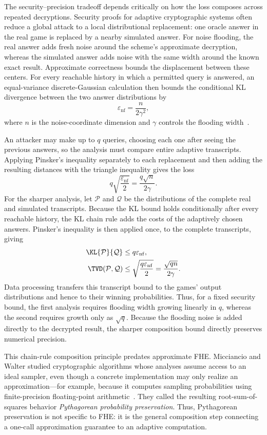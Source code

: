 The security--precision tradeoff depends critically on how the loss composes
across repeated decryptions.  Security proofs for adaptive cryptographic
systems often reduce a global attack to a local distributional replacement:
one oracle answer in the real game is replaced by a nearby simulated answer.
For noise flooding, the real answer adds fresh noise around the scheme's
approximate decryption, whereas the simulated answer adds noise with the same
width around the known exact result.  Approximate correctness bounds the
displacement between these centers.  For every reachable history in which a
permitted query is answered, an equal-variance discrete-Gaussian calculation
then bounds the conditional KL divergence between the two answer distributions
by
\[
  \varepsilon_{\mathrm{nf}} = \frac{n}{2\gamma^2},
\]
where \(n\) is the noise-coordinate dimension and \(\gamma\) controls the
flooding width~\cite{lmss}.

An attacker may make up to \(q\) queries, choosing each one after seeing the
previous answers, so the analysis must compare entire adaptive transcripts.
Applying Pinsker's inequality separately to each replacement and then adding
the resulting distances with the triangle inequality gives the loss
\[
  q\sqrt{\frac{\varepsilon_{\mathrm{nf}}}{2}}
  = \frac{q\sqrt{n}}{2\gamma}.
\]
For the sharper analysis, let \(\mathcal P\) and \(\mathcal Q\) be the
distributions of the complete real and simulated transcripts.  Because the KL
bound holds conditionally after every reachable history, the KL chain rule
adds the costs of the adaptively chosen answers.  Pinsker's inequality is then
applied once, to the complete transcripts, giving~\cite{lmss,mw17}
\begin{align*}
  \KL{\mathcal P}{\mathcal Q}
    &\leq q\varepsilon_{\mathrm{nf}},\\
  \TVD(\mathcal P,\mathcal Q)
    &\leq \sqrt{\frac{q\varepsilon_{\mathrm{nf}}}{2}}
     = \frac{\sqrt{qn}}{2\gamma}.
\end{align*}
Data processing transfers this transcript bound to the games' output
distributions and hence to their winning probabilities.
Thus, for a fixed security bound, the first analysis requires flooding width
growing linearly in \(q\), whereas the second requires growth only as
\(\sqrt q\).  Because the flooding noise is added directly to the decrypted
result, the sharper composition bound directly preserves numerical precision.

This chain-rule composition principle predates approximate FHE.
Micciancio and Walter studied cryptographic algorithms whose analyses assume
access to an ideal sampler, even though a concrete implementation may only
realize an approximation---for example, because it computes sampling
probabilities using finite-precision floating-point arithmetic~\cite{mw17}.
They called the resulting root-sum-of-squares behavior \emph{Pythagorean
probability preservation}.
Thus, Pythagorean preservation is not specific to FHE: it is the general
composition step connecting a one-call approximation guarantee to an adaptive
computation.

